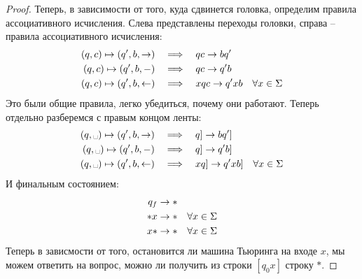 \begin{proof}
    Теперь, в зависимости от того, куда сдвинется головка, определим правила ассоциативного исчисления. Слева представлены переходы головки, справа -- правила ассоциативного исчисления: \begin{gather*}
        \begin{aligned}
            (q, c) \mapsto (q', b, \rightarrow) \quad \crel{\Longrightarrow} \quad qc \to bq' \\ 
            (q, c) \mapsto (q', b, -) \quad \crel{\Longrightarrow} \quad qc \to q'b \\
            (q, c) \mapsto (q', b, \leftarrow) \quad \crel{\Longrightarrow} \quad xqc \to q'xb \quad \forall x \in \Sigma \\
        \end{aligned}
    \end{gather*}
    Это были общие правила, легко убедиться, почему они работают. Теперь отдельно разберемся с правым концом ленты:
    \begin{gather*}
        \begin{aligned}
            (q, \text{\textvisiblespace}) \mapsto (q', b, \rightarrow) \quad \crel{\Longrightarrow} \quad q] \to bq'] \\
            (q, \text{\textvisiblespace}) \mapsto (q', b, -) \quad \crel{\Longrightarrow} \quad q] \to q'b] \\
            (q, \text{\textvisiblespace}) \mapsto (q', b, \leftarrow) \quad \crel{\Longrightarrow} \quad xq] \to q'xb] \quad \forall x \in \Sigma \\
        \end{aligned}
    \end{gather*}
    И финальным состоянием: \begin{gather*}
        \begin{aligned}
            q_f \crel{\to} * \\
            *x \crel{\to} * \quad \forall x \in \Sigma \\
            x* \crel{\to} * \quad \forall x \in \Sigma \\
        \end{aligned}
    \end{gather*}
    Теперь в зависмости от того, остановится ли машина Тьюринга на входе $x$, мы можем ответить на вопрос, можно ли получить из строки $[q_0x]$ строку $*$.
\end{proof}




